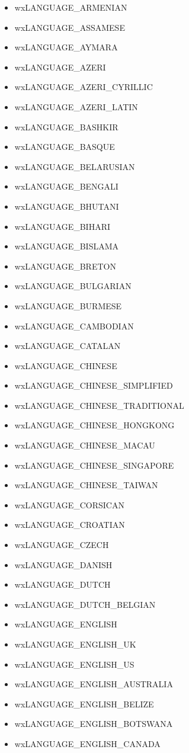 \begin{itemize}
\item wxLANGUAGE\_ARMENIAN
\item wxLANGUAGE\_ASSAMESE
\item wxLANGUAGE\_AYMARA
\item wxLANGUAGE\_AZERI
\item wxLANGUAGE\_AZERI\_CYRILLIC
\item wxLANGUAGE\_AZERI\_LATIN
\item wxLANGUAGE\_BASHKIR
\item wxLANGUAGE\_BASQUE
\item wxLANGUAGE\_BELARUSIAN
\item wxLANGUAGE\_BENGALI
\item wxLANGUAGE\_BHUTANI
\item wxLANGUAGE\_BIHARI
\item wxLANGUAGE\_BISLAMA
\item wxLANGUAGE\_BRETON
\item wxLANGUAGE\_BULGARIAN
\item wxLANGUAGE\_BURMESE
\item wxLANGUAGE\_CAMBODIAN
\item wxLANGUAGE\_CATALAN
\item wxLANGUAGE\_CHINESE
\item wxLANGUAGE\_CHINESE\_SIMPLIFIED
\item wxLANGUAGE\_CHINESE\_TRADITIONAL
\item wxLANGUAGE\_CHINESE\_HONGKONG
\item wxLANGUAGE\_CHINESE\_MACAU
\item wxLANGUAGE\_CHINESE\_SINGAPORE
\item wxLANGUAGE\_CHINESE\_TAIWAN
\item wxLANGUAGE\_CORSICAN
\item wxLANGUAGE\_CROATIAN
\item wxLANGUAGE\_CZECH
\item wxLANGUAGE\_DANISH
\item wxLANGUAGE\_DUTCH
\item wxLANGUAGE\_DUTCH\_BELGIAN
\item wxLANGUAGE\_ENGLISH
\item wxLANGUAGE\_ENGLISH\_UK
\item wxLANGUAGE\_ENGLISH\_US
\item wxLANGUAGE\_ENGLISH\_AUSTRALIA
\item wxLANGUAGE\_ENGLISH\_BELIZE
\item wxLANGUAGE\_ENGLISH\_BOTSWANA
\item wxLANGUAGE\_ENGLISH\_CANADA

\end{itemize}
